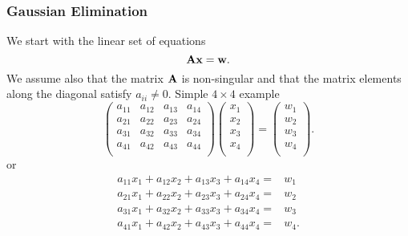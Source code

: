 \documentclass[compress]{beamer}
\begin{document}
\frame
{
  \frametitle{Gaussian Elimination}
\begin{small}
{\scriptsize
We start with the linear set of equations
\[
   {\bf A}{\bf x} = {\bf w}.
\]
We assume also that the matrix ${\bf A}$ is non-singular and that the
matrix elements along the diagonal satisfy $a_{ii} \ne 0$. Simple $4\times 4 $ example
\[
\left(\begin{array}{cccc}
                           a_{11}& a_{12} &a_{13}& a_{14}\\
                           a_{21}& a_{22} &a_{23}& a_{24}\\
                           a_{31}& a_{32} &a_{33}& a_{34}\\
                           a_{41}& a_{42} &a_{43}& a_{44}\\
                      \end{array} \right)\left(\begin{array}{c}
                           x_1\\
                           x_2\\
                           x_3 \\
                           x_4  \\
                      \end{array} \right)
  =\left(\begin{array}{c}
                           w_1\\
                           w_2\\
                           w_3 \\
                           w_4\\
                      \end{array} \right).
\]
or
\begin{eqnarray}
 a_{11}x_1 +a_{12}x_2 +a_{13}x_3 + a_{14}x_4=&w_1 \nonumber \\
a_{21}x_1 + a_{22}x_2 + a_{23}x_3 + a_{24}x_4=&w_2 \nonumber \\
a_{31}x_1 + a_{32}x_2 + a_{33}x_3 + a_{34}x_4=&w_3 \nonumber \\
a_{41}x_1 + a_{42}x_2 + a_{43}x_3 + a_{44}x_4=&w_4. \nonumber
\end{eqnarray}
}
\end{small}
}
\end{document}
